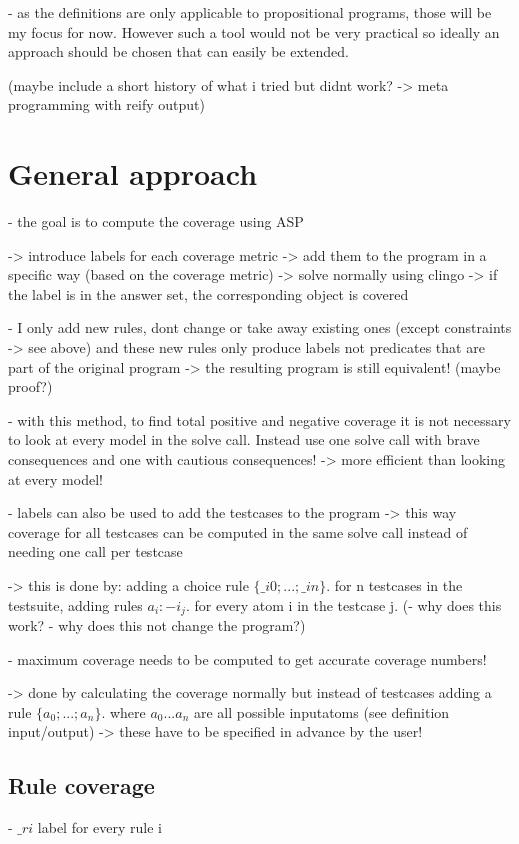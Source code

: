 - as the definitions are only applicable to propositional programs, those will be my focus for now. However such a tool would not 
be very practical so ideally an approach should be chosen that can easily be extended.

(maybe include a short history of what i tried but didnt work? -> meta programming with reify output)

\section{General approach}
\label{sec:Computing coverage metrics for propositional programs/General approach}
- the goal is to compute the coverage using ASP

-> introduce labels for each coverage metric -> add them to the program in a specific way (based on the coverage metric)  -> solve 
normally using clingo -> if the label is in the answer set, the corresponding object is covered

- I only add new rules, dont change or take away existing ones (except constraints -> see above) and these new rules only produce 
labels not predicates that are part of the original program -> the resulting program is still equivalent! (maybe proof?)

- with this method, to find total positive and negative coverage it is not necessary to look at every model in the solve call. 
Instead use one solve call with brave consequences and one with cautious consequences! -> more efficient than looking at every model!

- labels can also be used to add the testcases to the program -> this way coverage for all testcases can be computed in the same solve 
call instead of needing one call per testcase

-> this is done by: adding a choice rule $\{\_i0;...;\_in\}$. for n testcases in the testsuite, adding rules $a_i :- i_j$. for every atom i 
in the testcase j.
(- why does this work?
- why does this not change the program?)

- maximum coverage needs to be computed to get accurate coverage numbers!

-> done by calculating the coverage normally but instead of testcases adding a rule $\{a_0;...;a_n\}$. where $a_0...a_n$ are all possible 
inputatoms (see definition input/output) -> these have to be specified in advance by the user!

\subsection{Rule coverage}
\label{subsec:Computing coverage metrics for propositional programs/General approach/Rule coverage}
- $\_ri$ label for every rule i

